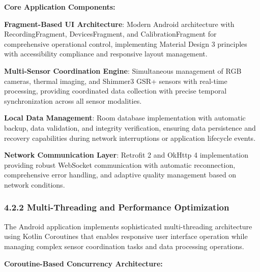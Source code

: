 \documentclass[12pt,a4paper]{article}
\begin{document}
\textbf{Core Application Components:}

\textbf{Fragment-Based UI Architecture}: Modern Android architecture with RecordingFragment, DevicesFragment, and
CalibrationFragment for comprehensive operational control, implementing Material Design 3 principles with accessibility
compliance and responsive layout management.

\textbf{Multi-Sensor Coordination Engine}: Simultaneous management of RGB cameras, thermal imaging, and Shimmer3 GSR+ sensors
with real-time processing, providing coordinated data collection with precise temporal synchronization across all sensor
modalities.

\textbf{Local Data Management}: Room database implementation with automatic backup, data validation, and integrity
verification, ensuring data persistence and recovery capabilities during network interruptions or application lifecycle
events.

\textbf{Network Communication Layer}: Retrofit 2 and OkHttp 4 implementation providing robust WebSocket communication with
automatic reconnection, comprehensive error handling, and adaptive quality management based on network conditions.

\subsubsection{4.2.2 Multi-Threading and Performance Optimization}

The Android application implements sophisticated multi-threading architecture using Kotlin Coroutines that enables
responsive user interface operation while managing complex sensor coordination tasks and data processing operations.

\textbf{Coroutine-Based Concurrency Architecture:}
\end{document}

